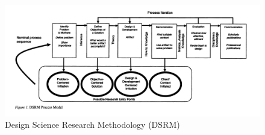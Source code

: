 \begin{figure}
\includegraphics[width=\textwidth]{pfeffers}
\caption{\citet{Peffers:2007:DSR:1481765.1481768} Design Science Research Methodology (DSRM)\label{fig:dsrm}}
\end{figure}
